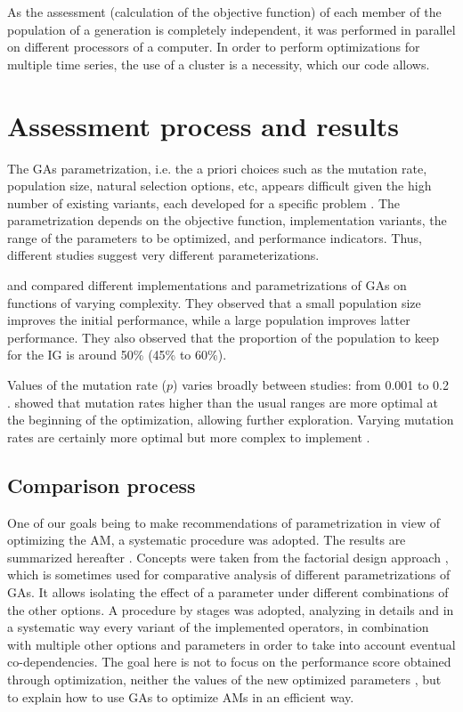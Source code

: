\documentclass{ametsoc}
\begin{document}
As the assessment (calculation of the objective function) of each member of the population of a generation is completely independent, it was performed in parallel on different processors of a computer. In order to perform optimizations for multiple time series, the use of a cluster is a necessity, which our code allows.


\section{Assessment process and results}
\label{sec:assessment}

The GAs parametrization, i.e. the a priori choices such as the mutation rate, population size, natural selection options, etc, appears difficult given the high number of existing variants, each developed for a specific problem \citep{Haupt2004, Costa2007a}. The parametrization depends on the objective function, implementation variants, the range of the parameters to be optimized, and performance indicators. Thus, different studies suggest very different parameterizations.

\citet{DeJong1975a} and \citet{Grefenstette1986} compared different implementations and parametrizations of GAs on functions of varying complexity. They observed that a small population size improves the initial performance, while a large population improves latter performance. They also observed that the proportion of the population to keep for the IG is around 50\% (45\% to 60\%).

Values of the mutation rate ($p$) varies broadly between studies: from 0.001 \citep{DeJong1975a} to 0.2 \citep{Haupt2004}. \citet{Back1996b} showed that mutation rates higher than the usual ranges are more optimal at the beginning of the optimization, allowing further exploration. Varying mutation rates are certainly more optimal but more complex to implement \citep{Back1996a, Back1996b}.


\subsection{Comparison process}

One of our goals being to make recommendations of parametrization in view of optimizing the AM, a systematic procedure was adopted. The results are summarized hereafter \citep[see][for the details]{Horton2012a}. Concepts were taken from the factorial design approach \citep[see eg.][]{Costa2005a,Costa2007a,Mariano2010a}, which is sometimes used for comparative analysis of different parametrizations of GAs. It allows isolating the effect of a parameter under different combinations of the other options. A procedure by stages was adopted, analyzing in details and in a systematic way every variant of the implemented operators, in combination with multiple other options and parameters in order to take into account eventual co-dependencies. The goal here is not to focus on the performance score obtained through optimization, neither the values of the new optimized parameters \citep[covered in][]{Horton2016b}, but to explain how to use GAs to optimize AMs in an efficient way.
\end{document}
